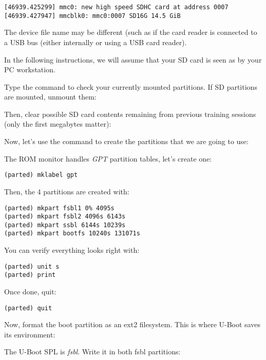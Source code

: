 \begin{verbatim}
[46939.425299] mmc0: new high speed SDHC card at address 0007
[46939.427947] mmcblk0: mmc0:0007 SD16G 14.5 GiB
\end{verbatim}

The device file name may be different (such as 
if the card reader is connected to a USB bus (either internally
or using a USB card reader).

In the following instructions, we will assume that your SD card is
seen as  by your PC workstation.

Type the  command to check your currently mounted
partitions. If SD partitions are mounted, unmount them:


Then, clear possible SD card contents remaining from previous
training sessions (only the first megabytes matter):


Now, let's use the  command to create the partitions that
we are going to use:


The ROM monitor handles {\em GPT} partition tables, let's create one:

\begin{verbatim}
(parted) mklabel gpt
\end{verbatim}

Then, the 4 partitions are created with:
\begin{verbatim}
(parted) mkpart fsbl1 0% 4095s
(parted) mkpart fsbl2 4096s 6143s
(parted) mkpart ssbl 6144s 10239s
(parted) mkpart bootfs 10240s 131071s
\end{verbatim}

You can verify everything looks right with:

\begin{verbatim}
(parted) unit s
(parted) print
\end{verbatim}

Once done, quit:
\begin{verbatim}
(parted) quit
\end{verbatim}


Now, format the boot partition as an ext2 filesystem. This is where
U-Boot saves its environment:

The U-Boot SPL is {\em fsbl}. Write it in both fsbl partitions:

